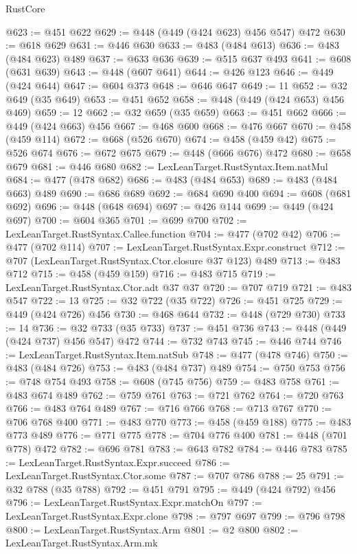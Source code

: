 \begin{lexlean}{RustCore}
\begin{coremodule}
@623 := @451 @622
@629 := @448 (@449 (@424 @623) @456 @547) @472
@630 := @618 @629
@631 := @446 @630
@633 := @483 (@484 @613)
@636 := @483 (@484 @623) @489
@637 := @633 @636
@639 := @515 @637 @493
@641 := @608 (@631 @639)
@643 := @448 (@607 @641)
@644 := @426 @123
@646 := @449 (@424 @644)
@647 := @604 @373
@648 := @646 @647
@649 := 11
@652 := @32 @649 (@35 @649)
@653 := @451 @652
@658 := @448 (@449 (@424 @653) @456 @469)
@659 := 12
@662 := @32 @659 (@35 @659)
@663 := @451 @662
@666 := @449 (@424 @663) @456
@667 := @468 @600
@668 := @476 @667
@670 := @458 (@459 @114)
@672 := @668 (@526 @670)
@674 := @458 (@459 @42)
@675 := @526 @674
@676 := @672 @675
@679 := @448 (@666 @676) @472
@680 := @658 @679
@681 := @446 @680
@682 := LexLeanTarget.RustSyntax.Item.natMul
@684 := @477 (@478 @682)
@686 := @483 (@484 @653)
@689 := @483 (@484 @663) @489
@690 := @686 @689
@692 := @684 @690 @400
@694 := @608 (@681 @692)
@696 := @448 (@648 @694)
@697 := @426 @144
@699 := @449 (@424 @697)
@700 := @604 @365
@701 := @699 @700
@702 := LexLeanTarget.RustSyntax.Callee.function
@704 := @477 (@702 @42)
@706 := @477 (@702 @114)
@707 := LexLeanTarget.RustSyntax.Expr.construct
@712 := @707 (LexLeanTarget.RustSyntax.Ctor.closure @37 @123) @489
@713 := @483 @712
@715 := @458 (@459 @159)
@716 := @483 @715
@719 := LexLeanTarget.RustSyntax.Ctor.adt @37 @37
@720 := @707 @719
@721 := @483 @547
@722 := 13
@725 := @32 @722 (@35 @722)
@726 := @451 @725
@729 := @449 (@424 @726) @456
@730 := @468 @644
@732 := @448 (@729 @730)
@733 := 14
@736 := @32 @733 (@35 @733)
@737 := @451 @736
@743 := @448 (@449 (@424 @737) @456 @547) @472
@744 := @732 @743
@745 := @446 @744
@746 := LexLeanTarget.RustSyntax.Item.natSub
@748 := @477 (@478 @746)
@750 := @483 (@484 @726)
@753 := @483 (@484 @737) @489
@754 := @750 @753
@756 := @748 @754 @493
@758 := @608 (@745 @756)
@759 := @483 @758
@761 := @483 @674 @489
@762 := @759 @761
@763 := @721 @762
@764 := @720 @763
@766 := @483 @764 @489
@767 := @716 @766
@768 := @713 @767
@770 := @706 @768 @400
@771 := @483 @770
@773 := @458 (@459 @188)
@775 := @483 @773 @489
@776 := @771 @775
@778 := @704 @776 @400
@781 := @448 (@701 @778) @472
@782 := @696 @781
@783 := @643 @782
@784 := @446 @783
@785 := LexLeanTarget.RustSyntax.Expr.succeed
@786 := LexLeanTarget.RustSyntax.Ctor.some
@787 := @707 @786
@788 := 25
@791 := @32 @788 (@35 @788)
@792 := @451 @791
@795 := @449 (@424 @792) @456
@796 := LexLeanTarget.RustSyntax.Expr.matchOn
@797 := LexLeanTarget.RustSyntax.Expr.clone
@798 := @797 @697
@799 := @796 @798
@800 := LexLeanTarget.RustSyntax.Arm
@801 := @2 @800
@802 := LexLeanTarget.RustSyntax.Arm.mk

\end{coremodule}
\end{lexlean}
